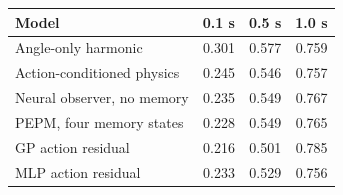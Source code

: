 \begin{tabular}{lrrr}
\toprule
Model & 0.1 s & 0.5 s & 1.0 s \\
\midrule
Angle-only harmonic & 0.301 & 0.577 & 0.759 \\
Action-conditioned physics & 0.245 & 0.546 & 0.757 \\
Neural observer, no memory & 0.235 & 0.549 & 0.767 \\
PEPM, four memory states & 0.228 & 0.549 & 0.765 \\
GP action residual & 0.216 & 0.501 & 0.785 \\
MLP action residual & 0.233 & 0.529 & 0.756 \\
\bottomrule
\end{tabular}
